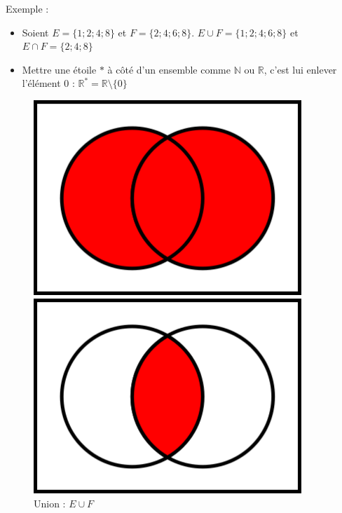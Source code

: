 \documentclass[10pt,a4paper]{book}
\newcommand{\N}{\mathbb{N}}
\newcommand{\R}{\mathbb{R}}
\begin{document}
Exemple : \begin{itemize}
    \item Soient $E = \{1;2;4;8\}$ et $F = \{2;4;6;8\}$. $E \cup F = \{1;2;4;6;8\}$ et $E \cap F = \{2;4;8\}$
    \item Mettre une étoile $*$ à côté d'un ensemble comme $\N$ ou $\R$, c'est lui enlever l'élément $0$ :  $\R^* = \R \setminus \{0\}$
\end{itemize}

    

\begin{figure}
    \centering
    \begin{minipage}{0.3\textwidth}
        \centering
        \includegraphics[width=0.9\textwidth]{Venn0111.png} 
        \caption{Union :  $E \cup F$}
    \end{minipage}
    \begin{minipage}{0.3\textwidth}
        \centering
        \includegraphics[width=0.9\textwidth]{Venn0001.png} 

\end{minipage}
\end{figure}
\end{document}
